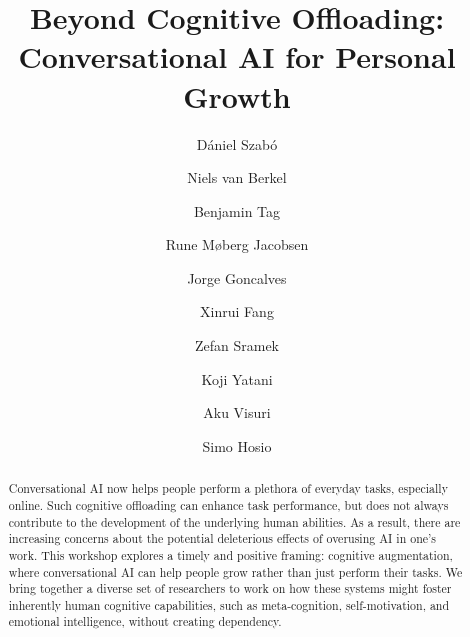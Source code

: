 \documentclass[manuscript,screen,review]{acmart}
\begin{document}
\title{Beyond Cognitive Offloading: Conversational AI for Personal Growth}



\author{Dániel Szabó}

\author{Niels van Berkel}

\author{Benjamin Tag}

\author{Rune Møberg Jacobsen}

\author{Jorge Goncalves}

\author{Xinrui Fang}

\author{Zefan Sramek}

\author{Koji Yatani}


\author{Aku Visuri}


\author{Simo Hosio}



\renewcommand{\shortauthors}{Szabó et al.}

\begin{abstract}
Conversational AI now helps people perform a plethora of everyday tasks, especially online. 
Such cognitive offloading can enhance task performance, but does not always contribute to the development of the underlying human abilities. 
As a result, there are increasing concerns about the potential deleterious effects of overusing AI in one's work. 
This workshop explores a timely and positive framing: cognitive augmentation, where conversational AI can help people grow rather than just perform their tasks.
We bring together a diverse set of researchers to work on how these systems might foster inherently human cognitive capabilities, such as meta-cognition, self-motivation, and emotional intelligence, without creating dependency.
\end{abstract}
\end{document}
